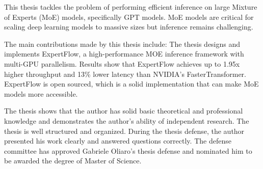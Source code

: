 
\begin{resolution}

This thesis tackles the problem of performing efficient inference on large Mixture of Experts (MoE) models, specifically GPT models. MoE models are critical for scaling deep learning models to massive sizes but inference remains challenging. 

The main contributions made by this thesis include:
The thesis designs and implements ExpertFlow, a high-performance MOE inference framework with multi-GPU parallelism. Results show that ExpertFlow achieves up to 1.95x higher throughput and 13\% lower latency than NVIDIA's FasterTransformer. ExpertFlow is open sourced, which is a solid implementation that can make MoE models more accessible.

The thesis shows that the author has solid basic theoretical and professional knowledge and demonstrates the author’s ability of independent research. The thesis is well structured and organized. During the thesis defense, the author presented his work clearly and answered questions correctly. The defense committee has approved Gabriele Oliaro's thesis defense and nominated him to be awarded the degree of Master of Science.

\end{resolution}
